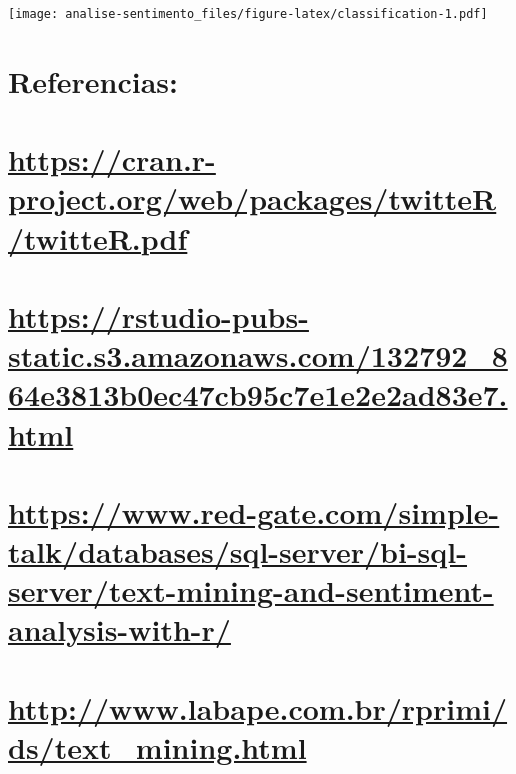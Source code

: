 \documentclass[
]{article}
\begin{document}
\texttt{[image: analise-sentimento\_files/figure-latex/classification-1.pdf]}

\hypertarget{referencias}{%
\section{Referencias:}\label{referencias}}

\hypertarget{httpscran.r-project.orgwebpackagestwittertwitter.pdf}{%
\section{\texorpdfstring{\url{https://cran.r-project.org/web/packages/twitteR/twitteR.pdf}}{https://cran.r-project.org/web/packages/twitteR/twitteR.pdf}}\label{httpscran.r-project.orgwebpackagestwittertwitter.pdf}}

\hypertarget{httpsrstudio-pubs-static.s3.amazonaws.com132792_864e3813b0ec47cb95c7e1e2e2ad83e7.html}{%
\section{\texorpdfstring{\url{https://rstudio-pubs-static.s3.amazonaws.com/132792_864e3813b0ec47cb95c7e1e2e2ad83e7.html}}{https://rstudio-pubs-static.s3.amazonaws.com/132792\_864e3813b0ec47cb95c7e1e2e2ad83e7.html}}\label{httpsrstudio-pubs-static.s3.amazonaws.com132792_864e3813b0ec47cb95c7e1e2e2ad83e7.html}}

\hypertarget{httpswww.red-gate.comsimple-talkdatabasessql-serverbi-sql-servertext-mining-and-sentiment-analysis-with-r}{%
\section{\texorpdfstring{\url{https://www.red-gate.com/simple-talk/databases/sql-server/bi-sql-server/text-mining-and-sentiment-analysis-with-r/}}{https://www.red-gate.com/simple-talk/databases/sql-server/bi-sql-server/text-mining-and-sentiment-analysis-with-r/}}\label{httpswww.red-gate.comsimple-talkdatabasessql-serverbi-sql-servertext-mining-and-sentiment-analysis-with-r}}

\hypertarget{httpwww.labape.com.brrprimidstext_mining.html}{%
\section{\texorpdfstring{\url{http://www.labape.com.br/rprimi/ds/text_mining.html}}{http://www.labape.com.br/rprimi/ds/text\_mining.html}}\label{httpwww.labape.com.brrprimidstext_mining.html}}
\end{document}
